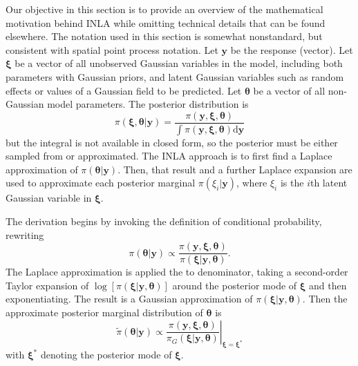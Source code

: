 \documentclass[]{interact}
\begin{document}
Our objective in this section is to provide an overview of the mathematical
motivation behind INLA while omitting technical details that can be found
elsewhere. The notation used in this section is somewhat nonstandard, but
consistent with spatial point process notation. Let \(\mathbf{y}\) be the
response (vector). Let \(\boldsymbol{\xi}\) be a vector of all unobserved
Gaussian variables in the model, including both parameters with Gaussian
priors, and latent Gaussian variables such as random effects or values of a
Gaussian field to be predicted. Let \(\boldsymbol{\theta}\) be a vector of all
non-Gaussian model parameters. The posterior distribution is
\begin{equation}
\pi\left(\boldsymbol{\xi}, \boldsymbol{\theta}| \mathbf{y}\right)
= \frac{\pi\left(\mathbf{y}, \boldsymbol{\xi}, \boldsymbol{\theta}\right)}
{\int \pi\left(\mathbf{y}, \boldsymbol{\xi}, \boldsymbol{\theta}\right)
\mathrm{d}\mathbf{y}}
\end{equation}
but the integral is not available in closed form, so the posterior must be
either sampled from or approximated. The INLA approach is to first find a
Laplace approximation of \(\pi\left(\boldsymbol{\theta} | \mathbf{y}\right)\).
Then, that result and a further Laplace expansion are used to approximate each
posterior marginal \(\pi\left(\xi_{i}| \mathbf{y}\right)\), where \(\xi_{i}\)
is the \(i\)th latent Gaussian variable in \(\boldsymbol{\xi}\).

The derivation begins by invoking the definition of conditional probability,
rewriting
\begin{equation}
\pi\left(\boldsymbol{\theta} | \mathbf{y}\right)
\propto \frac{\pi\left(\mathbf{y}, \boldsymbol{\xi}, \boldsymbol{\theta}\right)}
{\pi\left(\boldsymbol{\xi} | \mathbf{y}, \boldsymbol{\theta}\right)}.
\end{equation}
The Laplace approximation is applied the to denominator, taking a second-order
Taylor expansion of
\(\log\left[\pi\left(\boldsymbol{\xi} | \mathbf{y}, \boldsymbol{\theta}\right)\right]\)
around the posterior mode of \(\boldsymbol{\xi}\) and then exponentiating. The
result is a Gaussian approximation of
\(\pi\left(\boldsymbol{\xi} | \mathbf{y}, \boldsymbol{\theta}\right)\). Then
the approximate posterior marginal distribution of \(\boldsymbol{\theta}\) is
\begin{equation}
\tilde{\pi}\left(\boldsymbol{\theta} | \mathbf{y}\right)
\propto \left.\frac{\pi\left(\mathbf{y}, \boldsymbol{\xi}, \boldsymbol{\theta}\right)}
{\pi_{G}\left(\boldsymbol{\xi} | \mathbf{y}, \boldsymbol{\theta}\right)}
\right|_{\boldsymbol{\xi}=\boldsymbol{\xi}^{*}}
\end{equation}
with \(\boldsymbol{\xi}^{*}\) denoting the posterior mode of
\(\boldsymbol{\xi}\).
\end{document}
